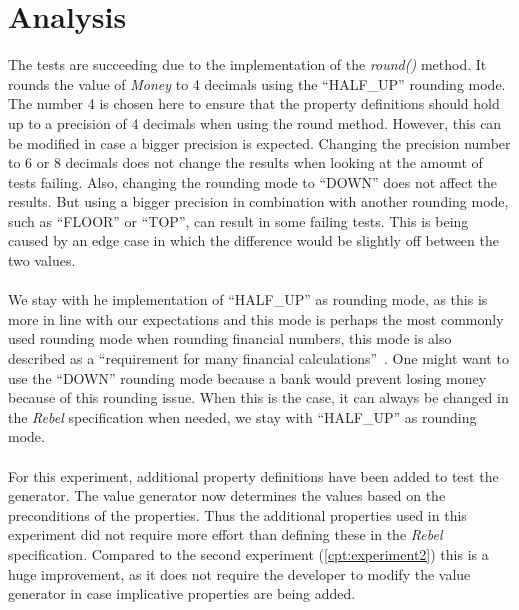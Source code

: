 \section{Analysis}
The tests are succeeding due to the implementation of the \textit{round()} method. It rounds the value of \textit{Money} to 4 decimals using the ``HALF\_UP'' rounding mode. The number 4 is chosen here to ensure that the property definitions should hold up to a precision of 4 decimals when using the round method. However, this can be modified in case a bigger precision is expected. Changing the precision number to 6 or 8 decimals does not change the results when looking at the amount of tests failing. Also, changing the rounding mode to ``DOWN'' does not affect the results. But using a bigger precision in combination with another rounding mode, such as ``FLOOR'' or ``TOP'', can result in some failing tests. This is being caused by an edge case in which the difference would be slightly off between the two values.\\
\\
We stay with he implementation of ``HALF\_UP'' as rounding mode, as this is more in line with our expectations and this mode is perhaps the most commonly used rounding mode when rounding financial numbers, this mode is also described as a ``requirement for many financial calculations''~\cite{cowlishaw2003decimal}. One might want to use the ``DOWN'' rounding mode because a bank would prevent losing money because of this rounding issue. When this is the case, it can always be changed in the \textit{Rebel} specification when needed, we stay with ``HALF\_UP'' as rounding mode.\\
\\
For this experiment, additional property definitions have been added to test the generator. The value generator now determines the values based on the preconditions of the properties. Thus the additional properties used in this experiment did not require more effort than defining these in the \textit{Rebel} specification. Compared to the second experiment (\autoref{cpt:experiment2}) this is a huge improvement, as it does not require the developer to modify the value generator in case implicative properties are being added.

